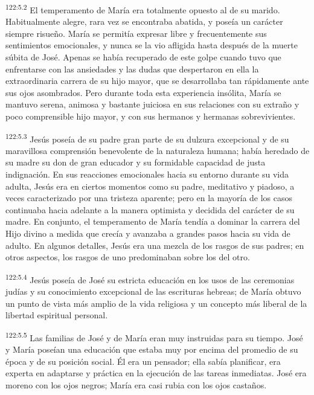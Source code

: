\par 
\textsuperscript{122:5.2} El temperamento de María era totalmente opuesto al de su marido. Habitualmente alegre, rara vez se encontraba abatida, y poseía un carácter siempre risueño. María se permitía expresar libre y frecuentemente sus sentimientos emocionales, y nunca se la vio afligida hasta después de la muerte súbita de José. Apenas se había recuperado de este golpe cuando tuvo que enfrentarse con las ansiedades y las dudas que despertaron en ella la extraordinaria carrera de su hijo mayor, que se desarrollaba tan rápidamente ante sus ojos asombrados. Pero durante toda esta experiencia insólita, María se mantuvo serena, animosa y bastante juiciosa en sus relaciones con su extraño y poco comprensible hijo mayor, y con sus hermanos y hermanas sobrevivientes.

\par 
\textsuperscript{122:5.3} Jesús poseía de su padre gran parte de su dulzura excepcional y de su maravillosa comprensión benevolente de la naturaleza humana; había heredado de su madre su don de gran educador y su formidable capacidad de justa indignación. En sus reacciones emocionales hacia su entorno durante su vida adulta, Jesús era en ciertos momentos como su padre, meditativo y piadoso, a veces caracterizado por una tristeza aparente; pero en la mayoría de los casos continuaba hacia adelante a la manera optimista y decidida del carácter de su madre. En conjunto, el temperamento de María tendía a dominar la carrera del Hijo divino a medida que crecía y avanzaba a grandes pasos hacia su vida de adulto. En algunos detalles, Jesús era una mezcla de los rasgos de sus padres; en otros aspectos, los rasgos de uno predominaban sobre los del otro.

\par 
\textsuperscript{122:5.4} Jesús poseía de José su estricta educación en los usos de las ceremonias judías y su conocimiento excepcional de las escrituras hebreas; de María obtuvo un punto de vista más amplio de la vida religiosa y un concepto más liberal de la libertad espiritual personal.

\par 
\textsuperscript{122:5.5} Las familias de José y de María eran muy instruidas para su tiempo. José y María poseían una educación que estaba muy por encima del promedio de su época y de su posición social. Él era un pensador; ella sabía planificar, era experta en adaptarse y práctica en la ejecución de las tareas inmediatas. José era moreno con los ojos negros; María era casi rubia con los ojos castaños.

